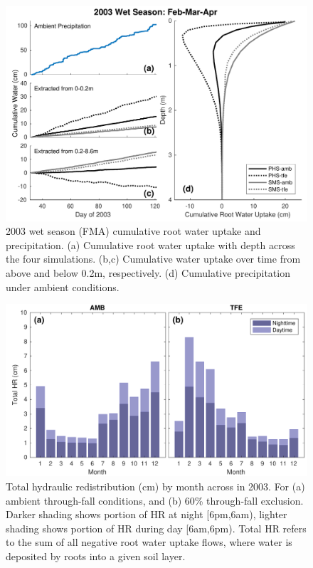\documentclass[draft,linenumbers]{agujournal}
\begin{document}
        \clearpage
    \begin{figure}[h]
     \centering
     \includegraphics[width=30pc]{../figs3/qwet.pdf}
     \caption{2003 wet season (FMA) cumulative root water uptake and precipitation. 
     (a) Cumulative root water uptake with depth across the four simulations.
     (b,c) Cumulative water uptake over time from above and below 0.2m, respectively.
     (d) Cumulative precipitation under ambient conditions.
     }
     \label{fig:qwet}
  \end{figure}
  
    \clearpage
    \begin{figure}[h]
     \centering
     \includegraphics[width=30pc]{../figs3/hr.pdf}
     \caption{Total hydraulic redistribution (cm) by month across in 2003. For (a) ambient through-fall conditions, and (b) 60\% through-fall exclusion. 
     Darker shading shows portion of HR at night [6pm,6am), lighter shading shows portion of HR during day [6am,6pm).
     Total HR refers to the sum of all negative root water uptake flows, where water is deposited by roots into a given soil layer.}
     \label{fig:hr}
  \end{figure}
\end{document}
